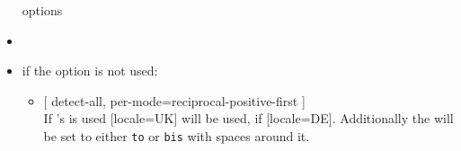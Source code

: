 \begin{multicols}{2}
\begin{itemize}[leftmargin=10pt]
      options
    \item {}
    \item if the  option is not used:
      \begin{itemize}
        \item {}
          [%
            detect-all,
            per-mode=reciprocal-positive-first%
          ]\\
          If 's  is used [locale=UK] will be used, if
           [locale=DE]. Additionally the  will be
          set to either \texttt{to} or \texttt{bis} with spaces around it.
      \end{itemize}
  \end{itemize}
\end{multicols}%
